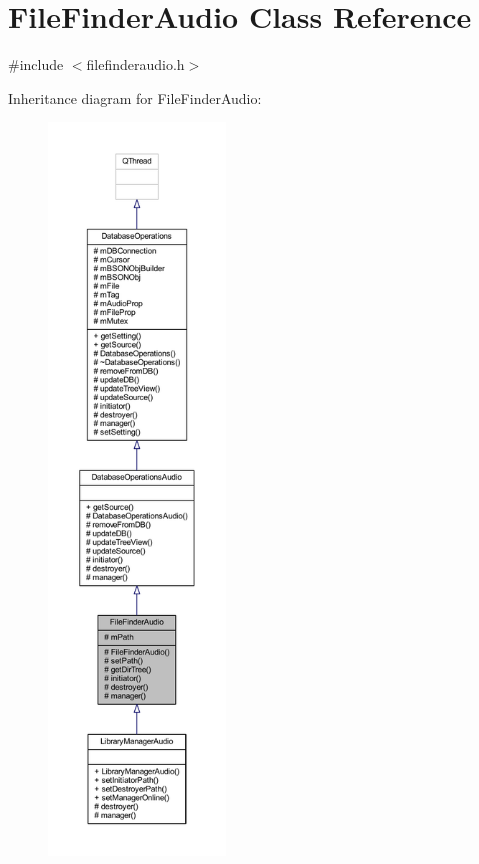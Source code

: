 \hypertarget{class_file_finder_audio}{\section{File\-Finder\-Audio Class Reference}
\label{class_file_finder_audio}
}


{\ttfamily \#include $<$filefinderaudio.\-h$>$}



Inheritance diagram for File\-Finder\-Audio\-:
\nopagebreak
\begin{figure}[H]
\begin{center}
\leavevmode
\includegraphics[height=550pt]{class_file_finder_audio__inherit__graph}
\end{center}
\end{figure}


